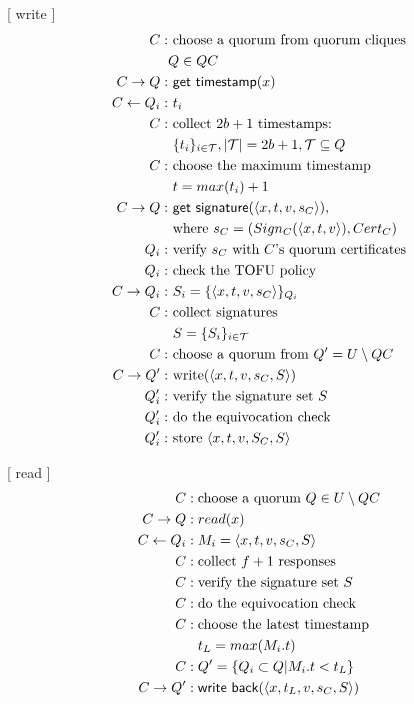 [ {\sf write} ]
\begin{align*}
  C :& \text{ choose a quorum from quorum cliques} \\
     & Q \in QC \\
  C \rightarrow Q :& \text{ {\sf get timestamp}}(x) \\
  C \leftarrow Q_i :& \text{ } t_i \\
  C :& \text{ collect } 2b+1 \text{ timestamps: } \\
     & \text{ } \{t_i\}_{i \in \mathcal{T}}, |\mathcal{T}|=2b+1,
       \mathcal{T} \subseteq Q \\
  C :& \text{ choose the maximum timestamp } \\
     & \text{ } t = max(t_i) + 1 \\
  C \rightarrow Q :& \text{ {\sf get signature}}(\langle x, t, v, s_C \rangle),\\
     & \text{ where } s_C = (Sign_C(\langle x, t, v \rangle), Cert_C) \\
  Q_i :& \text{ verify $s_C$ with $C$'s quorum certificates} \\
  Q_i :& \text{ check the TOFU policy} \\
  C \rightarrow Q_i :& \text{ } S_i = \{\langle x, t, v, s_C \rangle\}_{Q_i} \\
  C :& \text{ collect signatures } \\
     & \text{ } S = \{S_i\}_{i \in \mathcal{T}} \\
  C :& \text{ choose a quorum from } Q' = U \setminus QC \\
  C \rightarrow Q' :& \text{ write}(\langle x, t, v, s_C, S \rangle) \\
  Q'_i :& \text{ verify the signature set $S$} \\
  Q'_i :& \text{ do the equivocation check} \\
  Q'_i :& \text{ store } \langle x, t, v, S_C, S \rangle
\end{align*}

[ {\sf read} ]
\setcounter{equation}{0}
\begin{align*}
  C :&\; \text{choose a quorum } Q \in U \setminus QC \\
  C \rightarrow Q :&\; read(x) \\
  C \leftarrow Q_i :&\; M_i = \langle x, t, v, s_C, S \rangle \\
  C :&\; \text{collect } f + 1 \text{ responses} \\
  C :&\; \text{verify the signature set $S$} \\
  C :&\; \text{do the equivocation check} \\
  C :&\; \text{choose the latest timestamp } \\
     &\; t_L = max(M_i.t) \\
  C :&\; Q' = \{Q_i \subset Q | M_i.t < t_L\} \\
  C \rightarrow Q' :&\; \text{{\sf write back}}(\langle x, t_L, v, s_C, S \rangle)
\end{align*}



